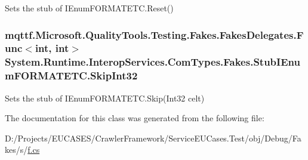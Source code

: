 Sets the stub of I\-Enum\-F\-O\-R\-M\-A\-T\-E\-T\-C.\-Reset()

\hypertarget{class_system_1_1_runtime_1_1_interop_services_1_1_com_types_1_1_fakes_1_1_stub_i_enum_f_o_r_m_a_t_e_t_c_ad1d1ae2c0d0073151436725e3d0f33e8}{
\subsubsection[{Skip\-Int32}]{\setlength{\rightskip}{0pt plus 5cm}mqttf.\-Microsoft.\-Quality\-Tools.\-Testing.\-Fakes.\-Fakes\-Delegates.\-Func$<$int, int$>$ System.\-Runtime.\-Interop\-Services.\-Com\-Types.\-Fakes.\-Stub\-I\-Enum\-F\-O\-R\-M\-A\-T\-E\-T\-C.\-Skip\-Int32}}\label{class_system_1_1_runtime_1_1_interop_services_1_1_com_types_1_1_fakes_1_1_stub_i_enum_f_o_r_m_a_t_e_t_c_ad1d1ae2c0d0073151436725e3d0f33e8}


Sets the stub of I\-Enum\-F\-O\-R\-M\-A\-T\-E\-T\-C.\-Skip(\-Int32 celt)



The documentation for this class was generated from the following file\-:\begin{DoxyCompactItemize}
\item 
D\-:/\-Projects/\-E\-U\-C\-A\-S\-E\-S/\-Crawler\-Framework/\-Service\-E\-U\-Cases.\-Test/obj/\-Debug/\-Fakes/s/\hyperlink{s_2f_8cs}{f.\-cs}\end{DoxyCompactItemize}
